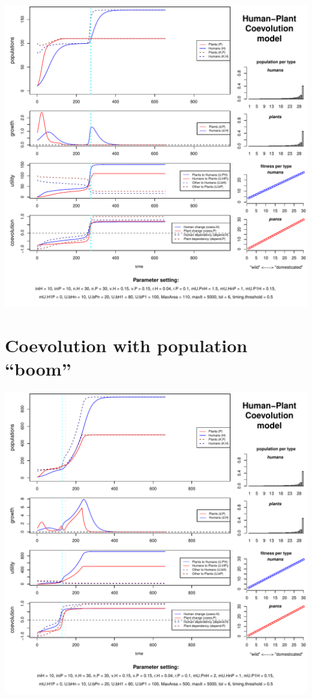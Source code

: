\documentclass[
]{book}
\begin{document}
\includegraphics{hpcModel-exploration_files/figure-latex/1_run.coevo.bleep-plot-1.pdf}

\newpage

\hypertarget{coevolution-with-population-boom}{%
\section{Coevolution with population ``boom''}\label{coevolution-with-population-boom}}

\includegraphics{hpcModel-exploration_files/figure-latex/1_run.coevo.boom-plot-1.pdf}
\end{document}
